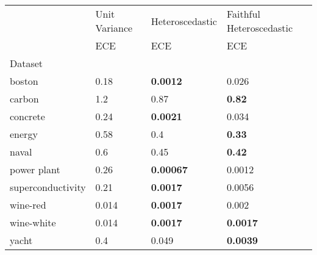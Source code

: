 \begin{tabular}{l|l|l|l}
\toprule
 & Unit Variance & Heteroscedastic & Faithful Heteroscedastic \\
 & ECE & ECE & ECE \\
Dataset &  &  &  \\
\midrule
boston & 0.18 & \bfseries 0.0012 & 0.026 \\
carbon & 1.2 & 0.87 & \bfseries 0.82 \\
concrete & 0.24 & \bfseries 0.0021 & 0.034 \\
energy & 0.58 & 0.4 & \bfseries 0.33 \\
naval & 0.6 & 0.45 & \bfseries 0.42 \\
power plant & 0.26 & \bfseries 0.00067 & 0.0012 \\
superconductivity & 0.21 & \bfseries 0.0017 & 0.0056 \\
wine-red & 0.014 & \bfseries 0.0017 & 0.002 \\
wine-white & 0.014 & \bfseries 0.0017 & \bfseries 0.0017 \\
yacht & 0.4 & 0.049 & \bfseries 0.0039 \\
\bottomrule
\end{tabular}
